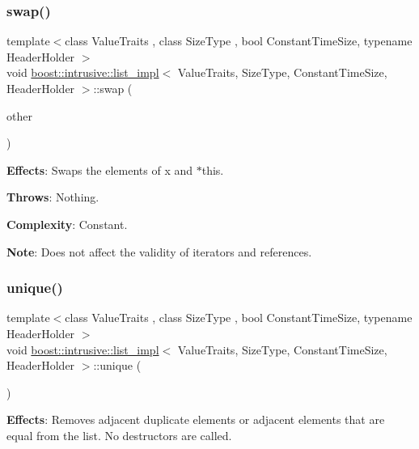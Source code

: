\subsubsection{\texorpdfstring{swap()}{swap()}}
{\footnotesize\ttfamily template$<$class Value\+Traits , class Size\+Type , bool Constant\+Time\+Size, typename Header\+Holder $>$ \\
void \hyperlink{classboost_1_1intrusive_1_1list__impl}{boost\+::intrusive\+::list\+\_\+impl}$<$ Value\+Traits, Size\+Type, Constant\+Time\+Size, Header\+Holder $>$\+::swap (\begin{DoxyParamCaption}\item[{\hyperlink{classboost_1_1intrusive_1_1list__impl}{list\+\_\+impl}$<$ Value\+Traits, Size\+Type, Constant\+Time\+Size, Header\+Holder $>$ \&}]{other }\end{DoxyParamCaption})\hspace{0.3cm}{\ttfamily [inline]}}

{\bfseries Effects}\+: Swaps the elements of x and $\ast$this.

{\bfseries Throws}\+: Nothing.

{\bfseries Complexity}\+: Constant.

{\bfseries Note}\+: Does not affect the validity of iterators and references. \mbox{\label{classboost_1_1intrusive_1_1list__impl_a9c7d8dd6a59be1e0c73eb19d1a6d0a50}} 
\subsubsection{\texorpdfstring{unique()}{unique()}\hspace{0.1cm}{\footnotesize\ttfamily [1/2]}}
{\footnotesize\ttfamily template$<$class Value\+Traits , class Size\+Type , bool Constant\+Time\+Size, typename Header\+Holder $>$ \\
void \hyperlink{classboost_1_1intrusive_1_1list__impl}{boost\+::intrusive\+::list\+\_\+impl}$<$ Value\+Traits, Size\+Type, Constant\+Time\+Size, Header\+Holder $>$\+::unique (\begin{DoxyParamCaption}{ }\end{DoxyParamCaption})\hspace{0.3cm}{\ttfamily [inline]}}

{\bfseries Effects}\+: Removes adjacent duplicate elements or adjacent elements that are equal from the list. No destructors are called.

